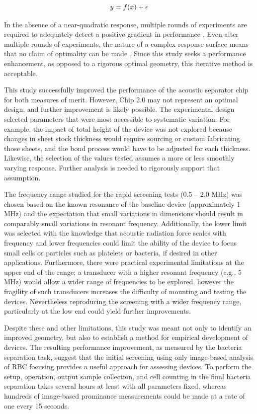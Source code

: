 \begin{equation}
\label{eqn:response}
  \hfill y=f(x)+\epsilon \hfill
\end{equation}

In the absence of a near-quadratic response, multiple rounds of experiments are required to adequately detect a positive gradient in performance \cite{carley2004response}. Even after multiple rounds of experiments, the nature of a complex response surface means that no claim of optimality can be made \cite{box2006improving}. Since this study seeks a performance enhancement, as opposed to a rigorous optimal geometry, this iterative method is acceptable.   

This study successfully improved the performance of the acoustic separator chip for both measures of merit. However, Chip 2.0 may not represent an optimal design, and further improvement is likely possible.  The experimental design selected parameters that were most accessible to systematic variation.  For example, the impact of total height of the device was not explored because changes in sheet stock thickness would require sourcing or custom fabricating those sheets, and the bond process would have to be adjusted for each thickness.  Likewise, the selection of the values tested assumes a more or less smoothly varying response.  Further analysis is needed to rigorously support that assumption.   

The frequency range studied for the rapid screening tests (0.5 -- 2.0 MHz) was chosen based on the known resonance of the baseline device (approximately 1 MHz) and the expectation that small variations in dimensions should result in comparably small variations in resonant frequency.  Additionally, the lower limit was selected with the knowledge that acoustic radiation force scales with frequency and lower frequencies could limit the ability of the device to focus small cells or particles such as platelets or bacteria, if desired in other applications.  Furthermore, there were practical experimental limitations at the upper end of the range; a transducer with a higher resonant frequency (e.g., 5 MHz) would allow a wider range of frequencies to be explored, however the fragility of such transducers increases the difficulty of mounting and testing the devices.  Nevertheless reproducing the screening with a wider frequency range, particularly at the low end could yield further improvements.


Despite these and other limitations, this study was meant not only to identify an improved geometry, but also to establish a method for empirical development of devices.  The resulting performance improvement, as measured by the bacteria separation task, suggest that the initial screening using only image-based analysis of RBC focusing provides a useful approach for assessing devices.  To perform the setup, operation, output sample collection, and cell counting in the final bacteria separation takes several hours at least with all parameters fixed, whereas hundreds of image-based prominance measurements could be made at a rate of one every 15 seconds. 

